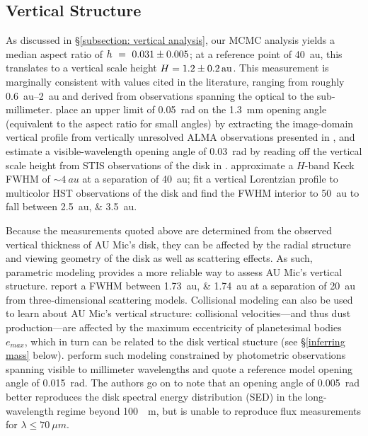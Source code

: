 \documentclass[modern]{aastex62}
\begin{document}
\subsection{Vertical Structure}
\label{subsection: vertical discussion}

As discussed in \S \ref{subsection: vertical analysis}, our MCMC analysis yields a median aspect ratio of $h~=~\num{0.031 \pm 0.005}$; at a reference point of \SI{40}{au}, this translates to a vertical scale height $H = \SI{1.2 \pm 0.2}{au}$.
This measurement is marginally consistent with values cited in the literature, ranging from roughly \SIrange{0.6}{2}{au} and derived from observations spanning the optical to the sub-millimeter.
\cite{schuppler17} place an upper limit of \SI{0.05}{rad} on the \SI{1.3}{mm} opening angle (equivalent to the aspect ratio for small angles) by extracting the image-domain vertical profile from vertically unresolved ALMA observations presented in \cite{macgregor13}, and estimate a visible-wavelength opening angle of \SI{0.03}{rad} by reading off the vertical scale height from STIS observations of the disk in \cite{schneider14}.
\cite{metchev05} approximate a $H$-band Keck FWHM of $\sim \SI{4}{au}$ at a separation of \SI{40}{au};
\cite{krist05} fit a vertical Lorentzian profile to multicolor HST observations of the disk and find the FWHM interior to \SI{50}{au} to fall between \SIlist{2.5;3.5}{au}.

Because the measurements quoted above are determined from the observed vertical thickness of AU Mic's disk, they can be affected by the radial structure and viewing geometry of the disk as well as scattering effects. 
As such, parametric modeling provides a more reliable way to assess AU Mic's vertical structure.
\cite{krist05} report a FWHM between \SIlist{1.73;1.74}{au} at a separation of \SI{20}{au} from three-dimensional scattering models.
Collisional modeling can also be used to learn about AU Mic's vertical structure: collisional velocities---and thus dust production---are affected by the maximum eccentricity of planetesimal bodies $e_{max}$, which in turn can be related to the disk vertical stucture (see \S \ref{inferring mass} below). 
\cite{schuppler17} perform such modeling constrained by photometric observations spanning visible to millimeter wavelengths and quote a reference model opening angle of \SI{0.015}{rad}.
The authors go on to note that an opening angle of \SI{0.005}{rad} better reproduces the disk spectral energy distribution (SED) in the long-wavelength regime beyond \SI{100}{\mu m}, but is unable to reproduce flux measurements for $\lambda \leq \SI{70}{\mu m}$.
\end{document}
